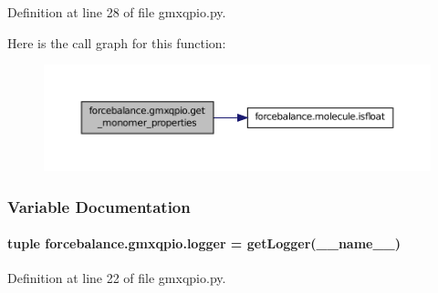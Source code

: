 Definition at line 28 of file gmxqpio.\-py.



Here is the call graph for this function\-:\nopagebreak
\begin{figure}[H]
\begin{center}
\leavevmode
\includegraphics[width=350pt]{namespaceforcebalance_1_1gmxqpio_a499ed366638eae7be524b18760a986b8_cgraph}
\end{center}
\end{figure}




\subsubsection{Variable Documentation}
\hypertarget{namespaceforcebalance_1_1gmxqpio_a0e3453a2d1b91945807c4b5e27b062a5}{
\paragraph[{logger}]{\setlength{\rightskip}{0pt plus 5cm}tuple forcebalance.\-gmxqpio.\-logger = get\-Logger(\-\_\-\-\_\-name\-\_\-\-\_\-)}}\label{namespaceforcebalance_1_1gmxqpio_a0e3453a2d1b91945807c4b5e27b062a5}


Definition at line 22 of file gmxqpio.\-py.

